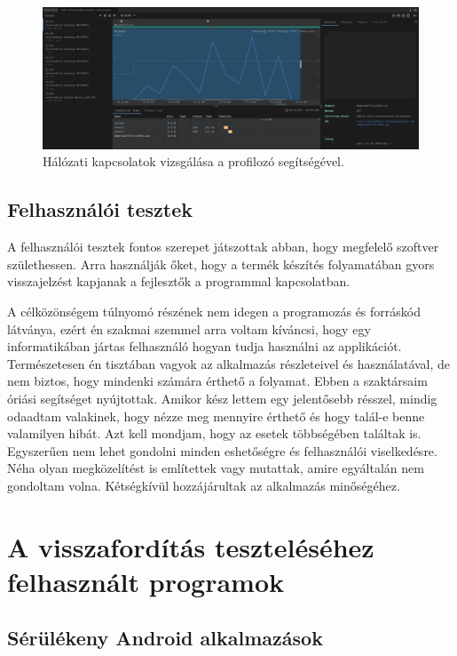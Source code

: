 \documentclass{thesis-ekf}
\theoremstyle{definition}
\theoremstyle{remark}
\begin{document}
\begin{figure}[!h]
	\centering
	\includegraphics[width=15cm]{pictures/network_performance}
	\caption{Hálózati kapcsolatok vizsgálása a profilozó segítségével.}
	\label{network_performance}
\end{figure}

\section{Felhasználói tesztek}

A felhasználói tesztek fontos szerepet játszottak abban, hogy megfelelő szoftver születhessen.
Arra használják őket, hogy a termék készítés folyamatában gyors visszajelzést kapjanak a fejlesztők a programmal kapcsolatban.

A célközönségem túlnyomó részének nem idegen a programozás és forráskód látványa, ezért én szakmai szemmel arra voltam kíváncsi, hogy egy informatikában jártas felhasználó hogyan tudja használni az applikációt.
Természetesen én tisztában vagyok az alkalmazás részleteivel és használatával, de nem biztos, hogy mindenki számára érthető a folyamat.
Ebben a szaktársaim óriási segítséget nyújtottak.
Amikor kész lettem egy jelentősebb résszel, mindig odaadtam valakinek, hogy nézze meg mennyire érthető és hogy talál-e benne valamilyen hibát.
Azt kell mondjam, hogy az esetek többségében találtak is.
Egyszerűen nem lehet gondolni minden eshetőségre és felhasználói viselkedésre.
Néha olyan megközelítést is említettek vagy mutattak, amire egyáltalán nem gondoltam volna.
Kétségkívül hozzájárultak az alkalmazás minőségéhez.

\chapter{A visszafordítás teszteléséhez felhasznált programok}\label{teszteles}

\section{Sérülékeny Android alkalmazások}
\end{document}
